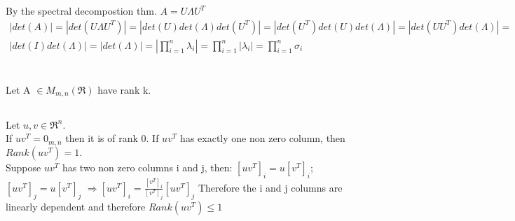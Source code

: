 \documentclass{article}
\begin{document}
	By the spectral decompostion thm. $A=U\Lambda U^{T}$
	\begin{gather*}
	|det(A)|=|det(U\Lambda U^{T})|=|det(U)det(\Lambda)det(U^{T})|=|det(U^{T})det(U)det(\Lambda)|=|det(UU^{T})det(\Lambda)|= \\ 
	|det(I)det(\Lambda)|=|det(\Lambda)|=
	\left|\prod_{i=1}^{n}\lambda_{i}\right|=\prod_{i=1}^{n}\left|\lambda_{i}\right|=\prod_{i=1}^{n}\sigma_{i}
	\end{gather*}
	\section{}
	Let A $\in M_{m,n}(\Re)$ have rank k.
	\subsection{}
	Let $u,v\in \Re^{n}$.\\
	If $uv^{T}=0_{m,n}$ then it is of rank 0. If $uv^{T}$ has exactly one non zero column, then $Rank(uv^T)=1.$ \\
	Suppose $uv^{T}$ has two non zero columns i and j, then:
	$[uv^T]_{i}=u[v^T]_{i}$; \quad $[uv^T]_{j}=u[v^T]_{j}$ $\Rightarrow [uv^T]_{i} = \frac{[v^T]_{i}}{[v^T]_{j}}[uv^T]_{j}$
	Therefore the i and j columns are linearly dependent and therefore $Rank (uv^T) \leq 1$ 
\end{document}
